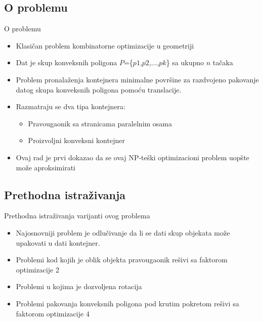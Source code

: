 \documentclass{beamer}
\theoremstyle{plain}
\begin{document}
\subsection{O problemu}
\begin{frame}{O problemu}
\begin{itemize}
    \item Klasičan problem kombinatorne optimizacije u geometriji
    \item Dat je skup konveksnih poligona $P$=\{$p{1}$,$p{2}$,...,$p{k}$\} sa ukupno $n$ tačaka 
    \item Problem pronalaženja kontejnera minimalne površine za razdvojeno pakovanje datog skupa konveksnih poligona pomoću translacije.
    \item Razmatraju se dva tipa kontejnera:
        \begin{itemize}
            \item Pravougaonik sa stranicama paralelnim osama
            \item Proizvoljni konveksni kontejner
        \end{itemize}
    \item Ovaj rad je prvi dokazao da se ovaj NP-teški optimizacioni problem uopšte može aproksimirati
        
\end{itemize}
\end{frame}

\subsection{Prethodna istraživanja}
\begin{frame}{Prethodna istraživanja varijanti ovog problema}
\begin{itemize}
        \item Najosnovniji problem je odlučivanje da li se dati skup objekata može upakovati u dati kontejner.
        \item Problemi kod kojih je oblik objekta pravougaonik rešivi sa faktorom optimizacije 2
        \item Problemi u kojima je dozvoljena rotacija
        \item Problemi pakovanja konveksnih poligona pod krutim pokretom rešivi sa faktorom optimizacije 4
        
\end{itemize}
\end{frame}
\end{document}
